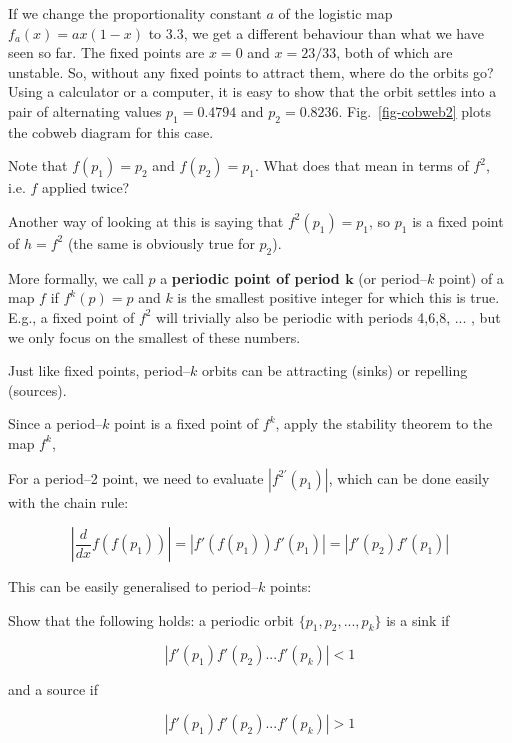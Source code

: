 If we change the proportionality constant $a$ of the logistic map $f_a(x)=ax(1-x)$ to 3.3, we get a different behaviour than what we have seen so far. The fixed points are $x=0$ and $x=23/33$, both of which are unstable. So, without any fixed points to attract them, where do the orbits go? Using a calculator or a computer, it is easy to show that the orbit settles into a pair of alternating values $p_1=0.4794$ and $p_2=0.8236$. Fig.~\ref{fig-cobweb2} plots the cobweb diagram for this case.

\begin{cue}
Note that $f(p_1)=p_2$ and $f(p_2)=p_1$. What does that mean in terms of $f^2$, i.e. $f$ applied twice?
\end{cue}

Another way of looking at this is saying that $f^2(p_1)=p_1$, so $p_1$ is a fixed point of $h=f^2$ (the same is obviously true for $p_2$).

More formally, we call $p$ a \textbf{periodic point of period $\mathbf k$} (or period--$k$ point) of a map $f$ if $f^k(p)=p$ and $k$ is the smallest positive integer for which this is true. E.g., a fixed point of $f^2$ will trivially also be periodic with periods 4,6,8, ... , but we only focus on the smallest of these numbers.

Just like fixed points, period--$k$ orbits can be attracting (sinks) or repelling (sources).

\begin{cue}
Since a period--$k$ point is a fixed point of $f^k$, apply the stability theorem to the map $f^k$,
\end{cue}

For a period--2 point, we need to evaluate $|f^{2'}(p_1)|$, which can be done easily with the chain rule:

\begin{equation}
\left|\frac{d}{dx} f(f(p_1))\right| = |f'(f(p_1)) f'(p_1)| = |f'(p_2) f'(p_1)|
\end{equation}  

This can be easily generalised to period--$k$ points:

\begin{exer}
Show that the following holds: a periodic orbit $\{p_1, p_2, ..., p_k\}$ is a sink if

$$|f'(p_1) f'(p_2) ... f'(p_k)| < 1$$

and a source if

$$|f'(p_1) f'(p_2) ... f'(p_k)| > 1$$

\end{exer}

